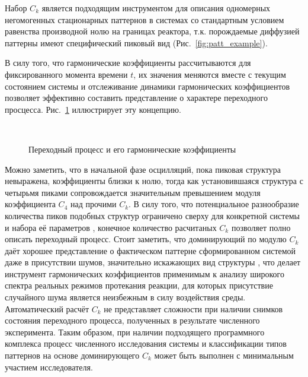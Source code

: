 Набор $C_k$ является подходящим инструментом для описания одномерных негомогенных стационарных паттернов в системах со стандартным условием равенства производной нолю на границах реактора, т.к. порождаемые диффузией паттерны имеют специфический пиковый вид (Рис.~\ref{fig:patt_example}).

\begin{figure}[ht]
\end{figure}

В силу того, что гармонические коэффициенты рассчитываются для фиксированного момента времени $t$, их значения меняются вместе с текущим состоянием системы и отслеживание динамики гармонических коэффициентов позволяет эффективно составить представление о характере переходного просцесса. Рис.~\ref{fig:ck_intro} иллюстрирует эту концепцию. 

\begin{figure}[ht]
    \\
    \caption{Переходный процесс и его гармонические коэффициенты}\label{fig:ck_intro}
\end{figure}

Можно заметить, что в начальной фазе осцилляций, пока пиковая структура невыражена, коэффициенты близки к нолю, тогда как установившаяся структура с четырьмя пиками сопровождается значительным превышением модуля коэффициента $C_4$ над прочими $C_k$. В силу того, что потенциальное разнообразие количества пиков подобных структур ограничено сверху для конкретной системы и набора её параметров \cite{woolley2017turing}, конечное количество расчитаных $C_k$ позволяет полно описать переходный процесс. Стоит заметить, что доминирующий по модулю $C_k$ даёт хорошее представление о фактическом паттерне сформированном системой даже в присутствии шумов, значительно искажающих вид структуры \cite{bib1}, что делает инструмент гармонических коэффициентов применимым к анализу широкого спектра реальных режимов протекания реакции, для которых присутствие случайного шума является неизбежным в силу воздействия среды. Автоматический расчёт $C_k$ не представляет сложности при наличии снимков состояния переходного процесса, полученных в результате численного эксперимента. Таким образом, при наличии подходящего программного комплекса \cite{progbib2} процесс численного исследования системы и классификации типов паттернов на основе доминирующего $C_k$ может быть выполнен с минимальным участием исследователя.

